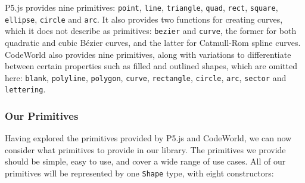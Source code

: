 \documentclass[../main.tex]{subfiles}
\begin{document}
                P5.js provides nine primitives: \texttt{point}, \texttt{line},
                    \texttt{triangle}, \texttt{quad}, \texttt{rect}, \texttt{square},
                    \texttt{ellipse}, \texttt{circle} and \texttt{arc}.
                It also provides two functions for creating curves, which it does not describe
                    as primitives: \texttt{bezier} and \texttt{curve}, the former for both
                    quadratic and cubic Bézier curves, and the latter for Catmull-Rom spline
                    curves.
                CodeWorld also provides nine primitives, along with variations to differentiate
                    between certain properties such as filled and outlined shapes, which are
                    omitted here: \texttt{blank}, \texttt{polyline}, \texttt{polygon},
                    \texttt{curve}, \texttt{rectangle}, \texttt{circle}, \texttt{arc},
                    \texttt{sector} and \texttt{lettering}.

            \subsubsection{Our Primitives}
                Having explored the primitives provided by P5.js and CodeWorld, we can now
                    consider what primitives to provide in our library.
                The primitives we provide should be simple, easy to use, and cover a wide range
                    of use cases.
                All of our primitives will be represented by one \texttt{Shape} type, with eight constructors:
\end{document}
